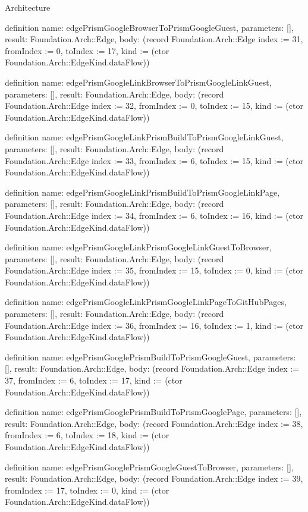 \begin{lexlean}{Architecture}
\begin{semanticmodule}
definition{
  name: edgePrismGoogleBrowserToPrismGoogleGuest,
  parameters: [],
  result: Foundation.Arch::Edge,
  body: (record Foundation.Arch::Edge {index := 31, fromIndex := 0, toIndex := 17, kind := (ctor Foundation.Arch::EdgeKind.dataFlow)})
}

definition{
  name: edgePrismGoogleLinkBrowserToPrismGoogleLinkGuest,
  parameters: [],
  result: Foundation.Arch::Edge,
  body: (record Foundation.Arch::Edge {index := 32, fromIndex := 0, toIndex := 15, kind := (ctor Foundation.Arch::EdgeKind.dataFlow)})
}

definition{
  name: edgePrismGoogleLinkPrismBuildToPrismGoogleLinkGuest,
  parameters: [],
  result: Foundation.Arch::Edge,
  body: (record Foundation.Arch::Edge {index := 33, fromIndex := 6, toIndex := 15, kind := (ctor Foundation.Arch::EdgeKind.dataFlow)})
}

definition{
  name: edgePrismGoogleLinkPrismBuildToPrismGoogleLinkPage,
  parameters: [],
  result: Foundation.Arch::Edge,
  body: (record Foundation.Arch::Edge {index := 34, fromIndex := 6, toIndex := 16, kind := (ctor Foundation.Arch::EdgeKind.dataFlow)})
}

definition{
  name: edgePrismGoogleLinkPrismGoogleLinkGuestToBrowser,
  parameters: [],
  result: Foundation.Arch::Edge,
  body: (record Foundation.Arch::Edge {index := 35, fromIndex := 15, toIndex := 0, kind := (ctor Foundation.Arch::EdgeKind.dataFlow)})
}

definition{
  name: edgePrismGoogleLinkPrismGoogleLinkPageToGitHubPages,
  parameters: [],
  result: Foundation.Arch::Edge,
  body: (record Foundation.Arch::Edge {index := 36, fromIndex := 16, toIndex := 1, kind := (ctor Foundation.Arch::EdgeKind.dataFlow)})
}

definition{
  name: edgePrismGooglePrismBuildToPrismGoogleGuest,
  parameters: [],
  result: Foundation.Arch::Edge,
  body: (record Foundation.Arch::Edge {index := 37, fromIndex := 6, toIndex := 17, kind := (ctor Foundation.Arch::EdgeKind.dataFlow)})
}

definition{
  name: edgePrismGooglePrismBuildToPrismGooglePage,
  parameters: [],
  result: Foundation.Arch::Edge,
  body: (record Foundation.Arch::Edge {index := 38, fromIndex := 6, toIndex := 18, kind := (ctor Foundation.Arch::EdgeKind.dataFlow)})
}

definition{
  name: edgePrismGooglePrismGoogleGuestToBrowser,
  parameters: [],
  result: Foundation.Arch::Edge,
  body: (record Foundation.Arch::Edge {index := 39, fromIndex := 17, toIndex := 0, kind := (ctor Foundation.Arch::EdgeKind.dataFlow)})
}


\end{semanticmodule}
\end{lexlean}

